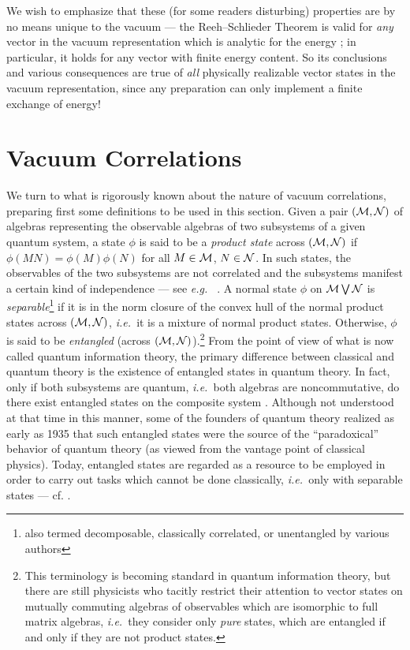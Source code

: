 \documentclass[12pt]{article}
\newcommand{\ie}{{\it i.e.\ }}
\newcommand{\eg}{{\it e.g.\ }}
\def\Ms{{\cal M}}
\def\Ns{{\cal N}}
\def\pair{{(\Ms,\Ns)}}
\begin{document}
     We wish to emphasize that these (for some readers disturbing)
properties are by no means unique to the vacuum --- the
Reeh--Schlieder Theorem is valid for {\it any} vector in the vacuum
representation which is analytic for the energy \cite{Bor1}; in
particular, it holds for any vector with finite energy content. So its
conclusions and various consequences are true of {\it all} physically
realizable vector states in the vacuum representation, since any
preparation can only implement a finite exchange of energy!


\section{Vacuum Correlations} \label{vaccor}

     We turn to what is rigorously known about the nature of vacuum
correlations, preparing first some definitions to be used in this
section. Given a pair $\pair$ of algebras representing the observable
algebras of two subsystems of a given quantum system, a state $\phi$
is said to be a {\it product state} across $\pair$ if $\phi(MN) =
\phi(M)\phi(N)$ for all $M \in \Ms$, $N \in \Ns$.  In such states, the
observables of the two subsystems are not correlated and the
subsystems manifest a certain kind of independence --- see \eg
\cite{Su2}. A normal state $\phi$ on $\Ms \bigvee \Ns$ is {\it
separable}\footnote{also termed decomposable, classically correlated,
or unentangled by various authors} if it is in the norm closure of the
convex hull of the normal product states across $\pair$, \ie it is a
mixture of normal product states.  Otherwise, $\phi$ is said to be
{\it entangled} (across $(\Ms,\Ns)$).\footnote{This terminology is
becoming standard in quantum information theory, but there are still
physicists who tacitly restrict their attention to vector states on
mutually commuting algebras of observables which are isomorphic to
full matrix algebras, \ie they consider only {\it pure} states, which
are entangled if and only if they are not product states.} From the
point of view of what is now called quantum information theory, the
primary difference between classical and quantum theory is the
existence of entangled states in quantum theory. In fact, only if both
subsystems are quantum, \ie both algebras are noncommutative, do there
exist entangled states on the composite system \cite{Rag}. Although
not understood at that time in this manner, some of the founders of
quantum theory realized as early as 1935 \cite{EPR,Schr} that such
entangled states were the source of the ``paradoxical'' behavior of
quantum theory (as viewed from the vantage point of classical
physics). Today, entangled states are regarded as a resource to be
employed in order to carry out tasks which cannot be done classically,
\ie only with separable states --- cf. \cite{Hor,Key,WW}.
\end{document}
